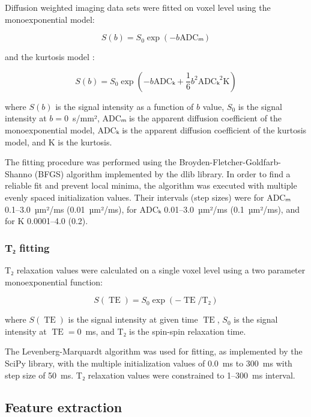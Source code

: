 \documentclass[10pt,letterpaper]{article}
\DeclareMathOperator{\TE}{TE}
\newcommand{\citep}{\cite}
\begin{document}
Diffusion weighted imaging data sets were fitted on voxel level using the
monoexponential model:

\begin{equation}
  S(b) = S_0 \exp(-b \text{ADCₘ})
\end{equation}

and the kurtosis model \citep{Jensen2005}:

\begin{equation}
  S(b) = S_0 \exp\left(
    -b \text{ADCₖ} + \frac{1}{6} b^2 \text{ADCₖ}^2 \text{K}
  \right)
\end{equation}

where $S(b)$ is the signal intensity as a function of $b$ value, $S_0$ is the
signal intensity at $b=0$~s/mm², ADCₘ is the apparent diffusion coefficient
of the monoexponential model, ADCₖ is the apparent diffusion coefficient of
the kurtosis model, and K is the kurtosis.

The fitting procedure was performed using the Broyden-Fletcher-Goldfarb-Shanno
(BFGS) algorithm \citep{Shanno1985} implemented by the dlib \citep{King2009}
library. In order to find a reliable fit and prevent local minima, the algorithm
was executed with multiple evenly spaced initialization values. Their intervals
(step sizes) were for ADCₘ 0.1--3.0~µm²/ms (0.01~µm²/ms), for ADCₖ
0.01--3.0~µm²/ms (0.1~µm²/ms), and for K 0.0001--4.0 (0.2).

\subsubsection{T₂ fitting}

T₂ relaxation values were calculated on a single voxel level using a two
parameter monoexponential function:

\begin{equation}
  S(\TE) = S_0 \exp(-\TE / \text{T₂})
\end{equation}

where $S(\TE)$ is the signal intensity at given time $\TE$, $S_0$ is the signal
intensity at $\TE=0$~ms, and T₂ is the spin-spin relaxation time.

The Levenberg-Marquardt algorithm was used for fitting, as implemented by the
SciPy library, with the multiple initialization values of 0.0~ms to 300~ms with
step size of 50~ms. T₂ relaxation values were constrained to 1--300~ms interval.


\subsection{Feature extraction}
\end{document}
